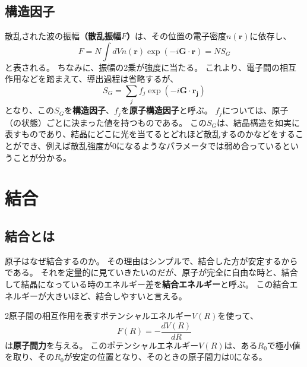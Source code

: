 \documentclass[a4paper]{jsreport}
\begin{document}
        \section{構造因子}
            散乱された波の振幅\textbf{（散乱振幅$F$）}は、その位置の電子密度$n(\boldsymbol{r})$に依存し、
            \begin{equation}
                F = N \int dV n(\boldsymbol{r}) \exp(-i\boldsymbol{G} \cdot \boldsymbol{r}) = NS_G
            \end{equation}
            と表される。
            ちなみに、振幅の2乗が強度に当たる。
            これより、電子間の相互作用などを踏まえて、導出過程は省略するが、
            \begin{equation}
                S_G = \sum_{j}f_j \exp(-i\boldsymbol{G} \cdot \boldsymbol{r_j})
            \end{equation}
            となり、この$S_G$を\textbf{構造因子}、$f_j$を\textbf{原子構造因子}と呼ぶ。
            $f_j$については、原子（の状態）ごとに決まった値を持つものである。
            この$S_G$は、結晶構造を如実に表すものであり、結晶にどこに光を当てるとどれほど散乱するのかなどをすることができ、例えば散乱強度が$0$になるようなパラメータでは弱め合っているということが分かる。




    \chapter{結合}
        \section{結合とは}
            原子はなぜ結合するのか。
            その理由はシンプルで、結合した方が安定するからである。
            それを定量的に見ていきたいのだが、原子が完全に自由な時と、結合して結晶になっている時のエネルギー差を\textbf{結合エネルギー}と呼ぶ。
            この結合エネルギーが大きいほど、結合しやすいと言える。\par
            2原子間の相互作用を表すポテンシャルエネルギー$V(R)$を使って、
            \begin{equation}
                F(R) = - \frac{dV(R)}{dR}
            \end{equation}
            は\textbf{原子間力}を与える。
            このポテンシャルエネルギー$V(R)$は、ある$R_0$で極小値を取り、その$R_0$が安定の位置となり、そのときの原子間力は$0$になる。\par
\end{document}
